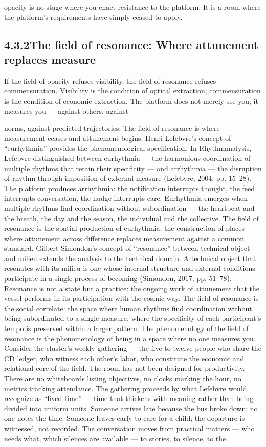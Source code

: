 opacity is no stage where you enact resistance to the platform. It is a room where the platform’s requirements have simply ceased to apply.

\subsection{4.3.2\quad The field of resonance: Where attunement replaces measure}

If the field of opacity refuses visibility, the field of resonance refuses commensuration. Visibility is the condition of optical extraction; commensuration is the condition of economic extraction. The platform does not merely see you; it measures you — against others, against

norms, against predicted trajectories. The field of resonance is where measurement ceases and attunement begins. Henri Lefebvre’s concept of “eurhythmia” provides the phenomenological specification. In Rhythmanalysis, Lefebvre distinguished between eurhythmia — the harmonious coordination of multiple rhythms that retain their specificity — and arrhythmia — the disruption of rhythm through imposition of external measure (Lefebvre, 2004, pp. 15–28). The platform produces arrhythmia: the notification interrupts thought, the feed interrupts conversation, the nudge interrupts care. Eurhythmia emerges when multiple rhythms find coordination without subordination — the heartbeat and the breath, the day and the season, the individual and the collective. The field of resonance is the spatial production of eurhythmia: the construction of places where attunement across difference replaces measurement against a common standard. Gilbert Simondon’s concept of “resonance” between technical object and milieu extends the analysis to the technical domain. A technical object that resonates with its milieu is one whose internal structure and external conditions participate in a single process of becoming (Simondon, 2017, pp. 51–78). Resonance is not a state but a practice: the ongoing work of attunement that the vessel performs in its participation with the cosmic way. The field of resonance is the social correlate: the space where human rhythms find coordination without being subordinated to a single measure, where the specificity of each participant’s tempo is preserved within a larger pattern. The phenomenology of the field of resonance is the phenomenology of being in a space where no one measures you. Consider the cluster’s weekly gathering — the five to twelve people who share the CD ledger, who witness each other’s labor, who constitute the economic and relational core of the field. The room has not been designed for productivity. There are no whiteboards listing objectives, no clocks marking the hour, no metrics tracking attendance. The gathering proceeds by what Lefebvre would recognize as “lived time” — time that thickens with meaning rather than being divided into uniform units. Someone arrives late because the bus broke down; no one notes the time. Someone leaves early to care for a child; the departure is witnessed, not recorded. The conversation moves from practical matters — who needs what, which silences are available — to stories, to silence, to the 